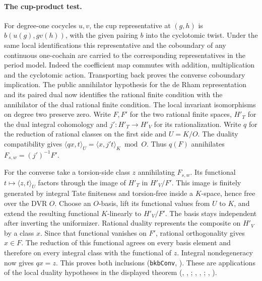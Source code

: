 \paragraph{The cup-product test.}
For degree-one cocycles $u,v$, the cup representative at $(g,h)$
is $b(u(g),g v(h))$, with the given pairing $b$ into the cyclotomic
twist. Under the same local identifications this representative and the
coboundary of any continuous one-cochain are carried to the corresponding
representatives in the period model. Indeed the coefficient map commutes
with addition, multiplication and the cyclotomic action. Transporting
back proves the converse coboundary implication. The public annihilator
hypothesis for the de Rham representation and its paired dual now
identifies the rational finite condition with the annihilator of the
dual rational finite condition. The local invariant isomorphisms on
degree two preserve zero. Write $F,F'$ for the two rational finite spaces, $H'_{T}$ for
the dual integral cohomology and $j':H'_T\to H'_{V}$ for its
rationalization. Write $q$ for the reduction of rational classes on
the first side and $U=K/O$. The duality compatibility gives
$\langle qx,t\rangle_U=\langle x,j't\rangle_K\bmod O$.
Thus $q(F)$ annihilates $F_{s,w}=(j')^{-1}F'$.

For the converse take a torsion-side class $z$ annihilating
$F_{s,w}$. Its functional $t\mapsto\langle z,t\rangle_U$
factors through the image of $H'_T$ in $H'_V/F'$. This image is
finitely generated by integral Tate finiteness and torsion-free
inside a $K$-space, hence free over the DVR $O$. Choose an $O$-basis,
lift its functional values from $U$ to $K$, and extend the resulting
functional $K$-linearly to $H'_V/F'$. The basis stays independent
after inverting the uniformizer. Rational duality represents the
composite on $H'_V$ by a class $x$. Since that functional vanishes
on $F'$, rational orthogonality gives $x\in F$. The reduction of
this functional agrees on every basis element and therefore on
every integral class with the functional of $z$. Integral
nondegeneracy now gives $qx=z$. This proves both inclusions
(\nolinkurl{bkbConv},
). These are applications of the local
duality hypotheses in the displayed theorem
(, ,
;
, , ;
, ).

